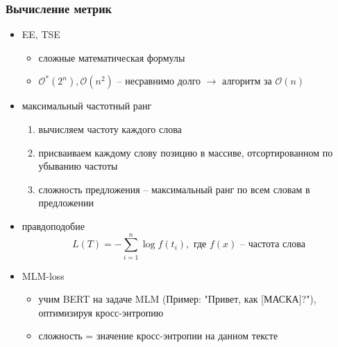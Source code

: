 \documentclass{beamer}
\begin{document}
\begin{frame}
	\frametitle{Вычисление метрик}
	\begin{itemize}
		\item EE, TSE
			\begin{itemize}
				\item сложные математическая формулы
				\item $\mathcal{O^*}(2^n), \mathcal{O}(n^2)$ -- несравнимо долго $\rightarrow$ алгоритм за $\mathcal{O}(n)$
			\end{itemize}
		\item максимальный частотный ранг
			\begin{enumerate}
				\item вычисляем частоту каждого слова
				\item присваиваем каждому слову позицию в массиве, отсортированном по убыванию частоты
				\item сложность предложения -- максимальный ранг по всем словам в предложении
			\end{enumerate}
		\item правдоподобие
			\[
				L(T) = -\sum\limits_{i=1}^{n}\log f(t_i), \text{ где } f(x) \text{ -- частота слова}
			\]
		\item MLM-loss
			\begin{itemize}
				\item учим BERT на задаче MLM (Пример: "Привет, как [МАСКА]?"), оптимизируя кросс-энтропию
				\item сложность = значение кросс-энтропии на данном тексте
			\end{itemize}
	\end{itemize}
\end{frame}
\end{document}
